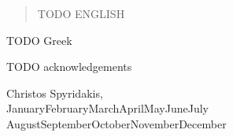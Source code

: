 \documentclass[
12pt, %
english, %
onehalfspacing,
liststotoc, %
headsepline, %
]{MastersDoctoralThesis} %
\newcommand*{\printdate}{%
   \ifcase \month\or January\or February\or March\or April\or May\or June\or July\or
    August\or September\or October\or November\or December\fi \space \number\year}
\begin{document}




\begin{abstract}
    \addchaptertocentry{\abstractname} %
    \par 
    TODO ENGLISH
\end{abstract}


\begin{AbstractGreek}
    \addchaptertocentry{\abstractname} %
    \par 
    TODO Greek
\end{AbstractGreek}


\begin{acknowledgements}
    \addchaptertocentry{\acknowledgementname} %
                               
    TODO acknowledgements
    \\ 
    
    \begin{flushright}
        Christos Spyridakis, \\
        \printdate
    \end{flushright}
\end{acknowledgements}

\end{document}
